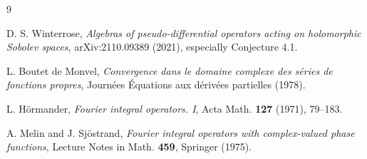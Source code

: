 \documentclass[11pt]{article}
\theoremstyle{remark}
\begin{document}
\begin{thebibliography}{9}

D. S. Winterrose,
\emph{Algebras of pseudo-differential operators acting on holomorphic Sobolev
spaces}, arXiv:2110.09389 (2021), especially Conjecture 4.1.

L. Boutet de Monvel,
\emph{Convergence dans le domaine complexe des s\'eries de fonctions propres},
Journ\'ees \'Equations aux d\'eriv\'ees partielles (1978).

L. H\"ormander,
\emph{Fourier integral operators. I}, Acta Math. \textbf{127} (1971), 79--183.

A. Melin and J. Sj\"ostrand,
\emph{Fourier integral operators with complex-valued phase functions},
Lecture Notes in Math. \textbf{459}, Springer (1975).

\end{thebibliography}
\end{document}
